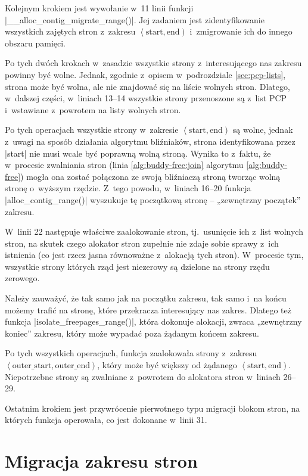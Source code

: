 Kolejnym krokiem jest wywołanie w~11 linii funkcji
\code|__alloc_contig_migrate_range()|.  Jej zadaniem jest
zidentyfikowanie wszystkich zajętych stron z~zakresu
$\left<\mathrm{start}, \mathrm{end}\right)$ i~zmigrowanie ich do
innego obszaru pamięci.

Po tych dwóch krokach w~zasadzie wszystkie strony z~interesującego nas
zakresu powinny być wolne.  Jednak, zgodnie z~opisem w~podrozdziale
\ref{sec:pcp-lists}, strona może być wolna, ale nie znajdować się na
liście wolnych stron.  Dlatego, w~dalszej części, w~liniach 13--14
wszystkie strony przenoszone są z~list PCP i~wstawiane z~powrotem na
listy wolnych stron.

Po tych operacjach wszystkie strony w~zakresie $\left<\mathrm{start},
\mathrm{end}\right)$ są wolne, jednak z~uwagi na sposób działania
algorytmu bliźniaków, strona identyfikowana przez \code|start|
nie musi wcale być poprawną wolną stroną.  Wynika to z~faktu, że
w~procesie zwalniania stron (linia \ref{alg:buddy-free:join} algorytmu
\ref{alg:buddy-free}) mogła ona zostać połączona ze swoją bliźniaczą
stroną tworząc wolną stronę o~wyższym rzędzie.  Z~tego powodu,
w~liniach 16--20 funkcja \code|alloc_contig_range()| wyszukuje tę
początkową stronę -- „zewnętrzny początek” zakresu.

W~linii 22 następuje właściwe zaalokowanie stron, tj.\ usunięcie ich
z~list wolnych stron, na skutek czego alokator stron zupełnie nie
zdaje sobie sprawy z~ich istnienia (co jest rzecz jasna równoważne
z~alokacją tych stron).  W~procesie tym, wszystkie strony których rząd
jest niezerowy są dzielone na strony rzędu zerowego.

Należy zauważyć, że tak samo jak na początku zakresu, tak samo i~na
końcu możemy trafić na stronę, które przekracza interesujący nas
zakres.  Dlatego też funkcja \code|isolate_freepages_range()|,
która dokonuje alokacji, zwraca „zewnętrzny koniec” zakresu, który
może wypadać poza żądanym końcem zakresu.

Po tych wszystkich operacjach, funkcja zaalokowała strony z~zakresu
$\left<\mathrm{outer\_start}, \mathrm{outer\_end}\right)$, który może
być większy od żądanego $\left<\mathrm{start}, \mathrm{end}\right)$.
Niepotrzebne strony są zwalniane z~powrotem do alokatora stron
w~liniach 26--29.

Ostatnim krokiem jest przywrócenie pierwotnego typu migracji blokom
stron, na których funkcja operowała, co jest dokonane w~linii 31.


\section{Migracja zakresu stron}\label{sec:alloc-contig-migrate-range}

